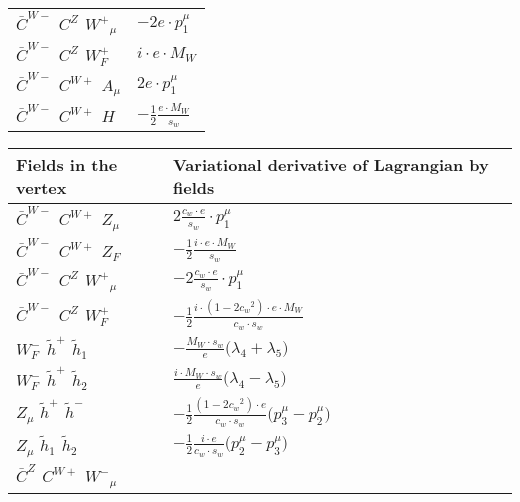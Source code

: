 \begin{center}
\begin{tabular}{|l|l|}
$\bar{C}^{W-}{}_{}$ \phantom{-} $C^{Z}{}_{}$ \phantom{-} $W^+{}_{\mu }$ \phantom{-}  &
	$-2 e\cdot p_1^\mu $\\[2mm]
$\bar{C}^{W-}{}_{}$ \phantom{-} $C^{Z}{}_{}$ \phantom{-} $W^+_F{}_{}$ \phantom{-}  &
	$ i \cdot e \cdot M_W$\\[2mm]
$\bar{C}^{W-}{}_{}$ \phantom{-} $C^{W+}{}_{}$ \phantom{-} ${A}_{\mu }$ \phantom{-}  &
	$2 e\cdot p_1^\mu $\\[2mm]
$\bar{C}^{W-}{}_{}$ \phantom{-} $C^{W+}{}_{}$ \phantom{-} ${H}_{}$ \phantom{-}  &
	$-\frac{1}{2}\frac{ e \cdot M_W}{ s_w}$\\ \hline
\end{tabular}

\begin{tabular}{|l|l|} \hline
Fields in the vertex & Variational derivative of Lagrangian by fields \\ \hline
$\bar{C}^{W-}{}_{}$ \phantom{-} $C^{W+}{}_{}$ \phantom{-} ${Z}_{\mu }$ \phantom{-}  &
	$2\frac{ c_w \cdot e}{ s_w}\cdot p_1^\mu $\\[2mm]
$\bar{C}^{W-}{}_{}$ \phantom{-} $C^{W+}{}_{}$ \phantom{-} $Z_F{}_{}$ \phantom{-}  &
	$-\frac{1}{2}\frac{ i \cdot e \cdot M_W}{ s_w}$\\[2mm]
$\bar{C}^{W-}{}_{}$ \phantom{-} $C^{Z}{}_{}$ \phantom{-} $W^+{}_{\mu }$ \phantom{-}  &
	$-2\frac{ c_w \cdot e}{ s_w}\cdot p_1^\mu $\\[2mm]
$\bar{C}^{W-}{}_{}$ \phantom{-} $C^{Z}{}_{}$ \phantom{-} $W^+_F{}_{}$ \phantom{-}  &
	$-\frac{1}{2}\frac{ i \cdot (1-2 c_w {}^2) \cdot e \cdot M_W}{ c_w \cdot s_w}$\\[2mm]
$W^-_F{}_{}$ \phantom{-} $\widetilde{h}^+{}_{}$ \phantom{-} $\widetilde{h}_1{}_{}$ \phantom{-}  &
	$-\frac{ M_W \cdot s_w}{ e}\big( \lambda_4+ \lambda_5\big)$\\[2mm]
$W^-_F{}_{}$ \phantom{-} $\widetilde{h}^+{}_{}$ \phantom{-} $\widetilde{h}_2{}_{}$ \phantom{-}  &
	$\frac{ i \cdot M_W \cdot s_w}{ e}\big( \lambda_4- \lambda_5\big)$\\[2mm]
${Z}_{\mu }$ \phantom{-} $\widetilde{h}^+{}_{}$ \phantom{-} $\widetilde{h}^-{}_{}$ \phantom{-}  &
	$-\frac{1}{2}\frac{ (1-2 c_w {}^2) \cdot e}{ c_w \cdot s_w}\big(p_3^\mu -p_2^\mu \big)$\\[2mm]
${Z}_{\mu }$ \phantom{-} $\widetilde{h}_1{}_{}$ \phantom{-} $\widetilde{h}_2{}_{}$ \phantom{-}  &
	$-\frac{1}{2}\frac{ i \cdot e}{ c_w \cdot s_w}\big(p_2^\mu -p_3^\mu \big)$\\[2mm]
$\bar{C}^{Z}{}_{}$ \phantom{-} $C^{W+}{}_{}$ \phantom{-} $W^-{}_{\mu }$ \phantom{-}  &

\end{tabular}
\end{center}
